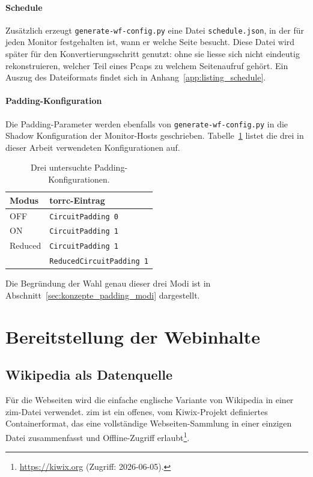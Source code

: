 \paragraph{Schedule}
Zusätzlich erzeugt \texttt{generate-wf-config.py} eine Datei \texttt{schedule.json}, in der für jeden Monitor festgehalten ist, wann er welche Seite besucht.
Diese Datei wird später für den Konvertierungsschritt genutzt: ohne sie liesse sich nicht eindeutig rekonstruieren, welcher Teil eines Pcaps zu welchem Seitenaufruf gehört.
Ein Auszug des Dateiformats findet sich in Anhang~\ref{app:listing_schedule}.

\paragraph{Padding-Konfiguration}
Die Padding-Parameter werden ebenfalls von \texttt{generate-wf-config.py} in die Shadow Konfiguration der Monitor-Hosts geschrieben.
Tabelle~\ref{tab:padding_modi} listet die drei in dieser Arbeit verwendeten Konfigurationen auf.

\begin{table}[H]
\centering
\caption{Drei untersuchte Padding-Konfigurationen.}
\label{tab:padding_modi}
\begin{tabular}{ll}
\hline
Modus & torrc-Eintrag \\
\hline
OFF & \texttt{CircuitPadding 0}  \\
ON & \texttt{CircuitPadding 1}  \\
Reduced & \texttt{CircuitPadding 1} \\
& \texttt{ReducedCircuitPadding 1} \\
\hline
\end{tabular}
\end{table}

Die Begründung der Wahl genau dieser drei Modi ist in Abschnitt~\ref{sec:konzepte_padding_modi} dargestellt.

\section{Bereitstellung der Webinhalte}
\label{sec:realisierung_webserver}

\subsection{Wikipedia als Datenquelle}

Für die Webseiten wird die einfache englische Variante von Wikipedia in einer \gls{zim}-Datei verwendet.
\gls{zim} ist ein offenes, vom Kiwix-Projekt definiertes Containerformat, das eine vollständige Webseiten-Sammlung in einer einzigen Datei zusammenfasst und Offline-Zugriff erlaubt\footnote{\url{https://kiwix.org} (Zugriff: 2026-06-05).}.

